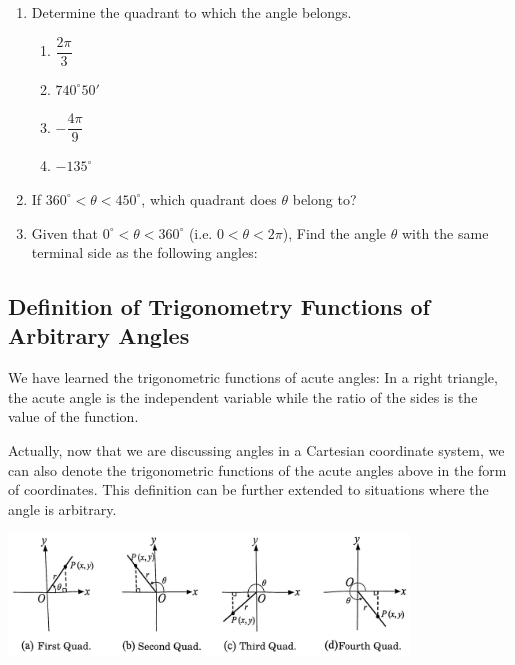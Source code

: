 \documentclass{report}
\begin{document}
\begin{enumerate}
    \item Determine the quadrant to which the angle belongs.
    \begin{multicols}{4}
        \begin{enumerate}[label=(\alph*)]
            \item $\dfrac{2\pi}{3}$
            \item $740^\circ 50'$
            \item $-\dfrac{4\pi}{9}$
            \item $-135^\circ$
        \end{enumerate}
    \end{multicols}
    \item If $360^\circ < \theta < 450^\circ$, which quadrant does $\theta$ belong to?
    \item Given that $0^\circ < \theta < 360^\circ$ (i.e. $0 < \theta < 2\pi$), Find the angle $\theta$ with the same terminal side as the following angles:
\end{enumerate}

\subsection*{Definition of Trigonometry Functions of Arbitrary Angles}

We have learned the trigonometric functions of acute angles: In a right triangle, the acute angle is the independent variable while the ratio of the sides is the value of the function.

Actually, now that we are discussing angles in a Cartesian coordinate system, we can also denote the trigonometric functions of the acute angles above in the form of coordinates. This definition can be further extended to situations where the angle is arbitrary.
\begin{center}
    \includegraphics[width=0.8\textwidth]{assets/9-4.jpg}
\end{center}
\vspace{-1em}
\end{document}
